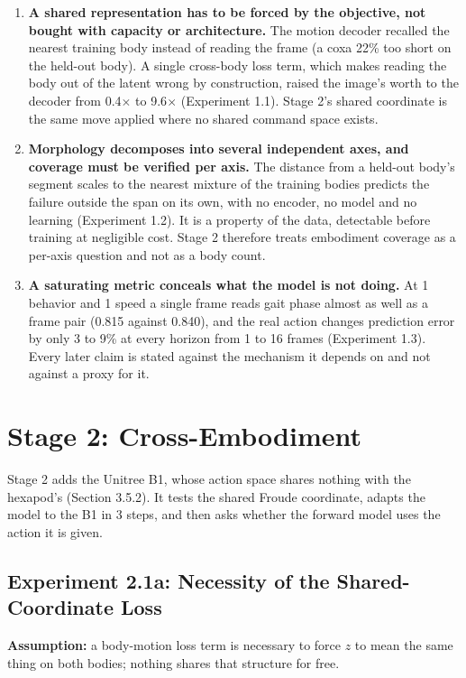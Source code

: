 \documentclass[12pt,a4paper,oneside]{report}
\begin{document}
\begin{enumerate}
  \item \textbf{A shared representation has to be forced by the objective, not bought with capacity or architecture.} The motion decoder recalled the nearest training body instead of reading the frame (a coxa 22\% too short on the held-out body). A single cross-body loss term, which makes reading the body out of the latent wrong by construction, raised the image's worth to the decoder from 0.4$\times$ to 9.6$\times$ (Experiment 1.1). Stage 2's shared coordinate is the same move applied where no shared command space exists.
  \item \textbf{Morphology decomposes into several independent axes, and coverage must be verified per axis.} The distance from a held-out body's segment scales to the nearest mixture of the training bodies predicts the failure outside the span on its own, with no encoder, no model and no learning (Experiment 1.2). It is a property of the data, detectable before training at negligible cost. Stage 2 therefore treats embodiment coverage as a per-axis question and not as a body count.
  \item \textbf{A saturating metric conceals what the model is not doing.} At 1 behavior and 1 speed a single frame reads gait phase almost as well as a frame pair (0.815 against 0.840), and the real action changes prediction error by only 3 to 9\% at every horizon from 1 to 16 frames (Experiment 1.3). Every later claim is stated against the mechanism it depends on and not against a proxy for it.
\end{enumerate}

\section{Stage 2: Cross-Embodiment}
Stage 2 adds the Unitree B1, whose action space shares nothing with the hexapod's (Section 3.5.2). It tests the shared Froude coordinate, adapts the model to the B1 in 3 steps, and then asks whether the forward model uses the action it is given.

\subsection{Experiment 2.1a: Necessity of the Shared-Coordinate Loss}


\textbf{Assumption:} a body-motion loss term is necessary to force $z$ to mean the same thing on both bodies; nothing shares that structure for free.
\end{document}
